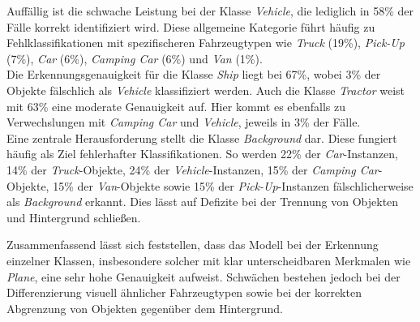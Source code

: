 Auffällig ist die schwache Leistung bei der Klasse \textit{Vehicle}, die lediglich in 58\% der Fälle korrekt identifiziert wird. Diese allgemeine Kategorie führt häufig zu Fehlklassifikationen mit spezifischeren Fahrzeugtypen wie \textit{Truck} (19\%), \textit{Pick-Up} (7\%), \textit{Car} (6\%), \textit{Camping Car} (6\%) und \textit{Van} (1\%).\\ Die Erkennungsgenauigkeit für die Klasse \textit{Ship} liegt bei 67\%, wobei 3\% der Objekte fälschlich als \textit{Vehicle} klassifiziert werden. Auch die Klasse \textit{Tractor} weist mit 63\% eine moderate Genauigkeit auf. Hier kommt es ebenfalls zu Verwechslungen mit \textit{Camping Car} und \textit{Vehicle}, jeweils in 3\% der Fälle. \\ Eine zentrale Herausforderung stellt die Klasse \textit{Background} dar. Diese fungiert häufig als Ziel fehlerhafter Klassifikationen. So werden 22\% der \textit{Car}-Instanzen, 14\% der \textit{Truck}-Objekte, 24\% der \textit{Vehicle}-Instanzen, 15\% der \textit{Camping Car}-Objekte, 15\% der \textit{Van}-Objekte sowie 15\% der \textit{Pick-Up}-Instanzen fälschlicherweise als \textit{Background} erkannt. Dies lässt auf Defizite bei der Trennung von Objekten und Hintergrund schließen.

Zusammenfassend lässt sich feststellen, dass das Modell bei der Erkennung einzelner Klassen, insbesondere solcher mit klar unterscheidbaren Merkmalen wie \textit{Plane}, eine sehr hohe Genauigkeit aufweist. Schwächen bestehen jedoch bei der Differenzierung visuell ähnlicher Fahrzeugtypen sowie bei der korrekten Abgrenzung von Objekten gegenüber dem Hintergrund. 


